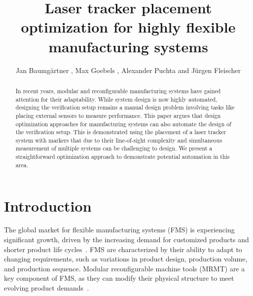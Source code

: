\documentclass{svproc}
\begin{document}
\mainmatter              %
\title{
Laser tracker placement optimization for highly flexible manufacturing systems
}


\newcommand*\samethanks[1][\value{footnote}]{\footnotemark[#1]}
\makeatletter
\renewcommand*{\@fnsymbol}[1]{\ifcase#1\or\@arabic{#1}\else*\fi}
\makeatother

\author{Jan Baumgärtner , 
Max Goebels ,   Alexander Puchta  and Jürgen Fleischer%
}


\maketitle

\begin{abstract}
In recent years, modular and reconfigurable manufacturing systems have gained attention for their adaptability. 
While system design is now highly automated, designing the verification setup remains a manual design problem involving tasks like placing external sensors to measure performance. 
This paper argues that design optimization approaches for manufacturing systems can also automate the design of the verification setup.
This is demonstrated using the placement of a laser tracker system with markers that due to their line-of-sight complexity and simultaneous measurement of multiple systems can be challenging to design.
We present a straightforward optimization approach to demonstrate potential automation in this area.
\end{abstract}
\section{Introduction}

The global market for flexible manufacturing systems (FMS) is experiencing significant growth, driven by the increasing demand for customized products and shorter product life cycles~\cite{westkaemperEinfuehrungOrganisationProduktion2006}. FMS are characterized by their ability to adapt to changing requirements, such as variations in product design, production volume, and production sequence. Modular reconfigurable machine tools (MRMT) are a key component of FMS, as they can modify their physical structure to meet evolving product demands~\cite{Padayachee2012}.
\end{document}
